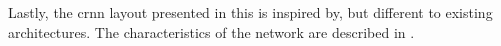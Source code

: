 
Lastly, the \gls{crnn} layout presented in this
\thesisdiss{} is inspired by, but different to existing
architectures. The characteristics of the network are
described in .
